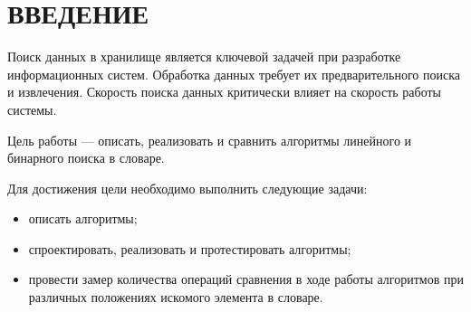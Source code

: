 \chapter*{ВВЕДЕНИЕ}

Поиск данных в хранилище является ключевой задачей при разработке информационных систем. Обработка данных требует их предварительного поиска и извлечения. Скорость поиска данных критически влияет на скорость работы системы.

Цель работы — описать, реализовать и сравнить алгоритмы линейного и бинарного поиска в словаре.

Для достижения цели необходимо выполнить следующие задачи:
\begin{itemize}[label=--]
    \item описать алгоритмы;
    \item спроектировать, реализовать и протестировать алгоритмы;
    \item провести замер количества операций сравнения в ходе работы алгоритмов при различных положениях искомого элемента в словаре.
\end{itemize}
